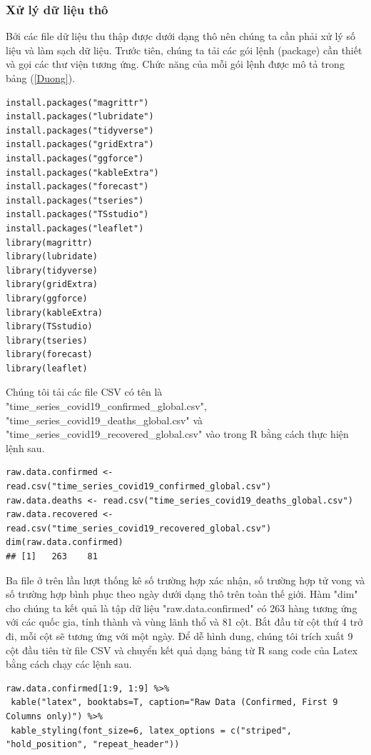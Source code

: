 \documentclass[12pt, a4paper,oneside]{book}
\theoremstyle{definition}
\begin{document}
\subsubsection{\label{xldlt}Xử lý dữ liệu thô}
Bởi các file dữ liệu thu thập được dưới dạng thô nên chúng ta cần phải xử lý số liệu và làm sạch dữ liệu. Trước tiên, chúng ta tải các gói lệnh (package) cần thiết và gọi các thư viện tương ứng. Chức năng của mỗi gói lệnh được mô tả trong bảng (\ref{Duong}).
\begin{lstlisting}
install.packages("magrittr")
install.packages("lubridate")
install.packages("tidyverse")
install.packages("gridExtra")
install.packages("ggforce")
install.packages("kableExtra")
install.packages("forecast")
install.packages("tseries")
install.packages("TSstudio")
install.packages("leaflet")
library(magrittr)
library(lubridate)
library(tidyverse)
library(gridExtra)
library(ggforce)
library(kableExtra)
library(TSstudio)
library(tseries)
library(forecast)
library(leaflet)
\end{lstlisting}
Chúng tôi tải các file CSV có tên là "time\_series\_covid19\_confirmed\_global.csv", "time\_series\_covid19\_deaths\_global.csv"  và "time\_series\_covid19\_recovered\_global.csv" vào trong R bằng cách thực hiện lệnh sau.
\begin{lstlisting}
raw.data.confirmed <- read.csv("time_series_covid19_confirmed_global.csv")
raw.data.deaths <- read.csv("time_series_covid19_deaths_global.csv")
raw.data.recovered <- read.csv("time_series_covid19_recovered_global.csv")
dim(raw.data.confirmed)
## [1]   263    81
\end{lstlisting}
Ba file ở trên lần lượt thống kê số trường hợp xác nhận, số trường hợp tử vong và số trường hợp bình phục theo ngày dưới dạng thô trên toàn thế giới. Hàm "dim" cho chúng ta kết quả là tập dữ liệu "raw.data.confirmed" có 263 hàng tương ứng với các quốc gia, tỉnh thành và vùng lãnh thổ và 81 cột. Bắt đầu từ cột thứ 4 trở đi, mỗi cột sẽ tương ứng với một ngày. Để dễ hình dung, chúng tôi trích xuất 9 cột đầu tiên từ file CSV và chuyển kết quả dạng bảng từ R sang code của Latex bằng cách chạy các lệnh sau.
\begin{lstlisting}
raw.data.confirmed[1:9, 1:9] %>%
 kable("latex", booktabs=T, caption="Raw Data (Confirmed, First 9 Columns only)") %>%
 kable_styling(font_size=6, latex_options = c("striped", "hold_position", "repeat_header"))
\end{lstlisting}
\end{document}
